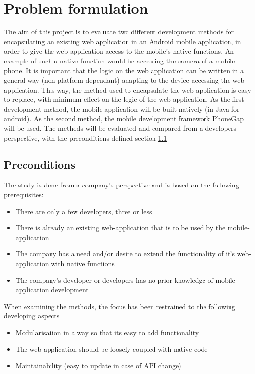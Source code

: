 \documentclass{cslthse-msc}
\begin{document}
\section{Problem formulation}
The aim of this project is to evaluate two different development methods for encapsulating an existing web application in an Android mobile application, in order to give the web application access to the mobile's native functions. An example of such a native function would be accessing the camera of a mobile phone. It is important that the logic on the web application can be written in a general way (non-platform dependant) adapting to the device accessing the web application. This way, the method used to encapsulate the web application is easy to replace, with minimum effect on the logic of the web application. 
\newline\newline
As the first development method, the mobile application will be built natively (in Java for android). As the second method, the mobile development framework PhoneGap will be used. The methods will be evaluated and compared from a developers perspective, with the preconditions defined section \ref{section-preconditions}

\subsection{Preconditions}\label{section-preconditions}
The study is done from a company's perspective and is based on the following prerequisites:
\begin{itemize}
\item There are only a few developers, three or less
\item There is already an existing web-application that is to be used by the mobile-application
\item The company has a need and/or desire to extend the functionality of it's web-application with native functions
\item The company's developer or developers has no prior knowledge of mobile application development
\end{itemize}

When examining the methods, the focus has been restrained to the following developing aspects
\begin{itemize}
\item Modularisation in a way so that its easy to add functionality
\item The web application should be loosely coupled with native code
\item Maintainability (easy to update in case of API change)
\end{itemize}
\end{document}
